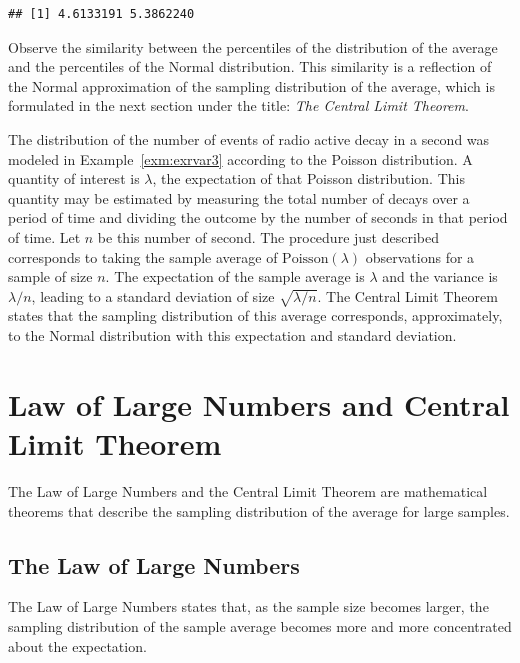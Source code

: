 \documentclass[]{krantz}
\theoremstyle{definition}
\theoremstyle{definition}
\theoremstyle{definition}
\theoremstyle{remark}
\let\BeginKnitrBlock\begin \let\EndKnitrBlock\end
\begin{document}
\begin{verbatim}
## [1] 4.6133191 5.3862240
\end{verbatim}

Observe the similarity between the percentiles of the distribution of
the average and the percentiles of the Normal distribution. This
similarity is a reflection of the Normal approximation of the sampling
distribution of the average, which is formulated in the next section
under the title: \emph{The Central Limit Theorem}.

\BeginKnitrBlock{example}
\protect\hypertarget{exm:exsampdist3}{}{\label{exm:exsampdist3} }The
distribution of the number of events of radio active decay in a second
was modeled in Example~\ref{exm:exrvar3} according to the Poisson
distribution. A quantity of interest is \(\lambda\), the expectation of
that Poisson distribution. This quantity may be estimated by measuring
the total number of decays over a period of time and dividing the
outcome by the number of seconds in that period of time. Let \(n\) be
this number of second. The procedure just described corresponds to
taking the sample average of \(\mathrm{Poisson}(\lambda)\) observations
for a sample of size \(n\). The expectation of the sample average is
\(\lambda\) and the variance is \(\lambda/n\), leading to a standard
deviation of size \(\sqrt{\lambda/n}\). The Central Limit Theorem states
that the sampling distribution of this average corresponds,
approximately, to the Normal distribution with this expectation and
standard deviation.
\EndKnitrBlock{example}

\section{Law of Large Numbers and Central Limit
Theorem}\label{law-of-large-numbers-and-central-limit-theorem}

The Law of Large Numbers and the Central Limit Theorem are mathematical
theorems that describe the sampling distribution of the average for
large samples.

\subsection{The Law of Large Numbers}\label{the-law-of-large-numbers}

The Law of Large Numbers states that, as the sample size becomes larger,
the sampling distribution of the sample average becomes more and more
concentrated about the expectation.
\end{document}
